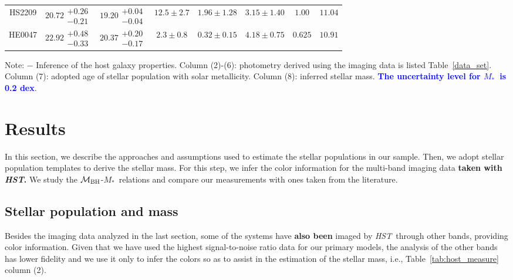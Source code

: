 \documentclass[fleqn,usenatbib]{mnras}
\newcommand{\hst}{{\it HST}}
\newcommand{\mbh}{$\mathcal M_{\rm BH}$}
\newcommand{\mstar}{{$M_*$}}
\newcommand{\blue}[1]{{\bf \textcolor{blue}{#1}}}
\begin{document}
\begin{table}
\begin{threeparttable}
\begin{tabular}{cccccccc}
HS2209 & $20.72\substack{+0.26\\-0.21}$ & $19.20\substack{+0.04\\-0.04}$ & $12.5\pm2.7$ & $1.96\pm1.28$ & $3.15\pm1.40$ & $1.00$ & $11.04$ \\
HE0047 & $22.92\substack{+0.48\\-0.33}$ & $20.37\substack{+0.20\\-0.17}$ & $2.3\pm0.8$ & $0.32\pm0.15$ & $4.18\pm0.75$ & $0.625$ & $10.91$ \\
\hline
\end{tabular}
\begin{tablenotes}
      \small
      \item Note: $-$ Inference of the host galaxy properties. Column (2)-(6): photometry derived using the imaging data is listed Table~\ref{data_set}. Column (7): adopted age of stellar population with solar metallicity. Column (8): inferred stellar mass. \blue{The uncertainty level for \mstar\ is 0.2 dex}.
\end{tablenotes}    
\end{threeparttable}
\end{table}

\section{Results}\label{sec:result}
In this section, we describe the approaches and assumptions used to estimate the stellar populations in our sample. Then, we adopt stellar population templates to derive the stellar mass. For this step, we infer the color information for the multi-band imaging data {\bf taken with \hst.}
We study the \mbh-\mstar\ relations and compare our measurements with ones taken from the literature.

\subsection{Stellar population and mass}\label{sec:mstar}
Besides the imaging data analyzed in the last section, some of the systems have {\bf also been} imaged by \hst\ through other bands, providing color information. Given that we have used the highest signal-to-noise ratio data for our primary models,  the analysis of the other bands has lower fidelity and we use it only to infer the colors so as to assist in the estimation of the stellar mass, i.e., Table~\ref{tab:host_measure} column (2).
\end{document}
